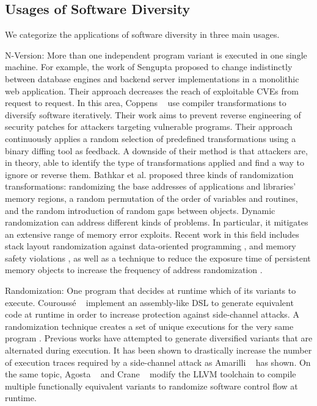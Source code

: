 \subsection*{Usages of Software Diversity}

We categorize the applications of software diversity in three main usages.

\begin{usage}{N-Version:}
    \label{usage:n-version}
    \normalfont
    More than one independent program variant is executed in one single machine. For example, the work of Sengupta \etal \cite{10.5555/3091125.3091155} proposed to change indistinctly between database engines and backend server implementations in a monolithic web application. Their approach decreases the reach of exploitable CVEs from request to request. 
    In this area, Coppens \etal~\cite{coppens2013feedback} use compiler transformations to diversify software iteratively. Their work aims to prevent reverse engineering of security patches for attackers targeting vulnerable programs.
    Their approach continuously applies a random selection of predefined transformations using a binary diffing tool as feedback. 
    A downside of their method is that attackers are, in theory, able to identify the type of transformations applied and find a way to ignore or reverse them.
    Bathkar et al. \cite{bhatkar03,bhatkar2005efficient} proposed three kinds of randomization transformations: randomizing the base addresses of applications and libraries' memory regions, a random permutation of the order of variables and routines, and the random introduction of random gaps between objects. 
    Dynamic randomization can address different kinds of problems. In particular, it mitigates an extensive range of memory error exploits. 
    Recent work in this field includes stack layout randomization against data-oriented programming \cite{aga2019smokestack}, and memory safety violations \cite{lee2021savior}, as well as a technique to reduce the exposure time of persistent memory objects to increase the frequency of address randomization \cite{xu2020merr}.
\end{usage}


\begin{usage}{Randomization:}
    \label{usage:randomization}
    \normalfont
    One program that decides at runtime which of its variants to execute. Courouss{\'e} \etal~\cite{courousse2016runtime} implement an assembly-like DSL to generate equivalent code at runtime in order to increase protection against side-channel attacks. 
    A randomization technique creates a set of unique executions for the very same program \cite{bhatkar03}. 
    Previous works have attempted to generate diversified variants that are alternated during execution.
    It has been shown to drastically increase the number of execution traces required by a side-channel attack as
    Amarilli \etal~\cite{amarilli2011can} has shown. On the same topic,
    Agosta \etal~\cite{agosta2015meet} and Crane \etal~\cite{crane2015thwarting}
    modify the LLVM toolchain to compile multiple functionally equivalent variants to randomize software control flow at runtime.
\end{usage}

